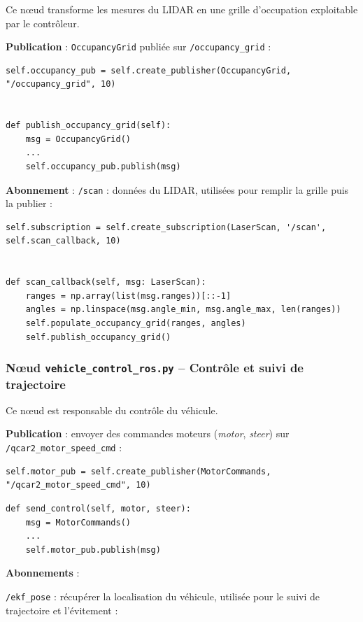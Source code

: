 \documentclass{name}
\begin{document}
Ce nœud transforme les mesures du LIDAR en une grille d'occupation exploitable par le contrôleur.

\textbf{Publication} : \texttt{OccupancyGrid} publiée sur \texttt{/occupancy\_grid} :

\begin{lstlisting}[style=pythonstyle]
self.occupancy_pub = self.create_publisher(OccupancyGrid, "/occupancy_grid", 10)


def publish_occupancy_grid(self):
    msg = OccupancyGrid()
    ...
    self.occupancy_pub.publish(msg)
\end{lstlisting}

\textbf{Abonnement} : \texttt{/scan} : données du LIDAR, utilisées pour remplir la grille puis la publier :

\begin{lstlisting}[style=pythonstyle]
self.subscription = self.create_subscription(LaserScan, '/scan', self.scan_callback, 10)


def scan_callback(self, msg: LaserScan):
    ranges = np.array(list(msg.ranges))[::-1]
    angles = np.linspace(msg.angle_min, msg.angle_max, len(ranges))
    self.populate_occupancy_grid(ranges, angles)
    self.publish_occupancy_grid()
\end{lstlisting}

\subsubsection{Nœud \texttt{vehicle\_control\_ros.py} – Contrôle et suivi de trajectoire}

Ce nœud est responsable du contrôle du véhicule.

\textbf{Publication} : envoyer des commandes moteurs (\textit{motor}, \textit{steer}) sur \texttt{/qcar2\_motor\_speed\_cmd} :

\begin{lstlisting}[style=pythonstyle]
self.motor_pub = self.create_publisher(MotorCommands, "/qcar2_motor_speed_cmd", 10)
\end{lstlisting}

\begin{lstlisting}[style=pythonstyle]
def send_control(self, motor, steer):
    msg = MotorCommands()
    ...
    self.motor_pub.publish(msg)
\end{lstlisting}

\textbf{Abonnements} :

\texttt{/ekf\_pose} : récupérer la localisation du véhicule, utilisée pour le suivi de trajectoire et l'évitement :
\end{document}
